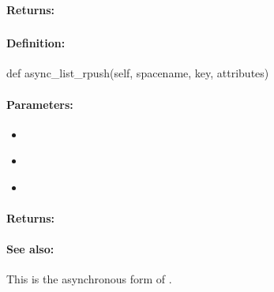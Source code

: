 \paragraph{Returns:}


\pagebreak
\subsubsection{}
\label{api:python:async_list_rpush}


\paragraph{Definition:}
\begin{pythoncode}
def async_list_rpush(self, spacename, key, attributes)
\end{pythoncode}

\paragraph{Parameters:}
\begin{itemize}[noitemsep]
\item {}\\

\item {}\\

\item {}\\

\end{itemize}

\paragraph{Returns:}


\paragraph{See also:}  This is the asynchronous form of .

\pagebreak
\subsubsection{}
\label{api:python:microtransaction_list_rpush}



